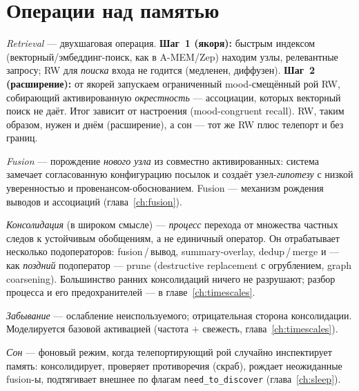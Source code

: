 \section{Операции над памятью}

\begin{definition}
\emph{Retrieval} — двухшаговая операция. \textbf{Шаг~1 (якоря):} быстрым индексом
(векторный/эмбеддинг-поиск, как в A-MEM/Zep) находим узлы, релевантные запросу; RW
для \emph{поиска} входа не годится (медленен, диффузен). \textbf{Шаг~2
(расширение):} от якорей запускаем ограниченный mood-смещённый рой RW, собирающий
активированную \emph{окрестность} — ассоциации, которых векторный поиск не даёт.
Итог зависит от настроения (mood-congruent recall). RW, таким образом, нужен и днём
(расширение), а сон — тот же RW плюс телепорт и без границ.
\end{definition}

\begin{definition}
\emph{Fusion} — порождение \emph{нового узла} из совместно активированных: система
замечает согласованную конфигурацию посылок и создаёт узел-\emph{гипотезу} с низкой
уверенностью и провенансом-обоснованием. Fusion — механизм рождения выводов и
ассоциаций (глава~\ref{ch:fusion}).
\end{definition}

\begin{definition}[Консолидация]
\emph{Консолидация} (в широком смысле) — \emph{процесс} перехода от множества частных
следов к устойчивым обобщениям, а не единичный оператор. Он отрабатывает несколько
подоператоров: fusion\,/\,вывод, summary-overlay, dedup\,/\,merge и — как \emph{поздний}
подоператор — prune (destructive replacement с огрублением, graph coarsening).
Большинство ранних консолидаций ничего не разрушают; разбор процесса и его
предохранителей — в главе~\ref{ch:timescales}.
\end{definition}

\begin{definition}
\emph{Забывание} — ослабление неиспользуемого; отрицательная сторона консолидации.
Моделируется базовой активацией (частота $+$ свежесть, глава~\ref{ch:timescales}).
\end{definition}

\begin{definition}
\emph{Сон} — фоновый режим, когда телепортирующий рой случайно инспектирует память:
консолидирует, проверяет противоречия (скраб), рождает неожиданные fusion-ы,
подтягивает внешнее по флагам \texttt{need\_to\_discover} (глава~\ref{ch:sleep}).
\end{definition}

